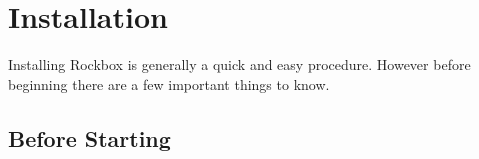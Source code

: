\chapter{Installation}\label{sec:installation}

Installing Rockbox is generally a quick and easy procedure. However
before beginning there are a few important things to know.

\section{Before Starting}


